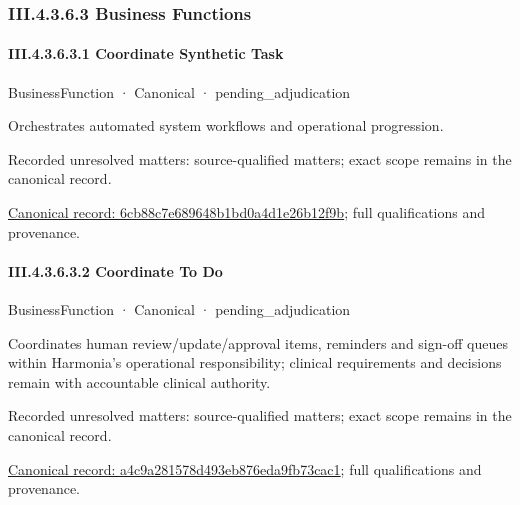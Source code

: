 \subsubsection*{III.4.3.6.3 Business Functions}
\label{navigation:III.4.3.6.3}

\paragraph*{III.4.3.6.3.1 Coordinate Synthetic Task}
\label{navigation:III.4.3.6.3.1}

\label{element:6cb88c7e689648b1bd0a4d1e26b12f9b}
{\small BusinessFunction · Canonical · pending\_adjudication}\par

Orchestrates automated system workflows and operational progression.


{\small Recorded unresolved matters: source-qualified matters; exact scope remains in the canonical record.}\par
{\footnotesize \href{../../../../../../../../continuum/business/business-function/6cb88c7e689648b1bd0a4d1e26b12f9b.md}{Canonical record: 6cb88c7e689648b1bd0a4d1e26b12f9b}; full qualifications and provenance.}\par
\paragraph*{III.4.3.6.3.2 Coordinate To Do}
\label{navigation:III.4.3.6.3.2}

\label{element:a4c9a281578d493eb876eda9fb73cac1}
{\small BusinessFunction · Canonical · pending\_adjudication}\par

Coordinates human review/update/approval items, reminders and sign-off queues within Harmonia's operational responsibility; clinical requirements and decisions remain with accountable clinical authority.


{\small Recorded unresolved matters: source-qualified matters; exact scope remains in the canonical record.}\par
{\footnotesize \href{../../../../../../../../continuum/business/business-function/a4c9a281578d493eb876eda9fb73cac1.md}{Canonical record: a4c9a281578d493eb876eda9fb73cac1}; full qualifications and provenance.}\par
